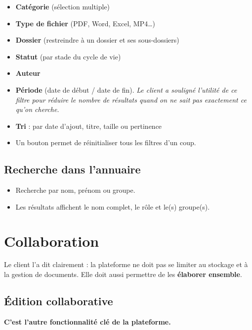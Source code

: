 \documentclass[a4paper,12pt,french]{article}
\begin{document}
\begin{itemize}[leftmargin=1.5em]
  \item \textbf{Catégorie} (sélection multiple)
  \item \textbf{Type de fichier} (PDF, Word, Excel, MP4\ldots)
  \item \textbf{Dossier} (restreindre à un dossier et ses sous-dossiers)
  \item \textbf{Statut} (par stade du cycle de vie)
  \item \textbf{Auteur}
  \item \textbf{Période} (date de début / date de fin). \textit{Le client a souligné l'utilité de ce filtre pour réduire le nombre de résultats quand on ne sait pas exactement ce qu'on cherche.}
  \item \textbf{Tri} : par date d'ajout, titre, taille ou pertinence
  \item Un bouton permet de réinitialiser tous les filtres d'un coup.
\end{itemize}

\subsection{Recherche dans l'annuaire}

\begin{itemize}[leftmargin=1.5em]
  \item Recherche par nom, prénom ou groupe.
  \item Les résultats affichent le nom complet, le rôle et le(s) groupe(s).
\end{itemize}


\section{Collaboration}

Le client l'a dit clairement : la plateforme ne doit pas se limiter au stockage et à la gestion de documents. Elle doit aussi permettre de les \textbf{élaborer ensemble}.

\subsection{Édition collaborative}

\textcolor{accentgreen}{\textbf{C'est l'autre fonctionnalité clé de la plateforme.}}
\end{document}
